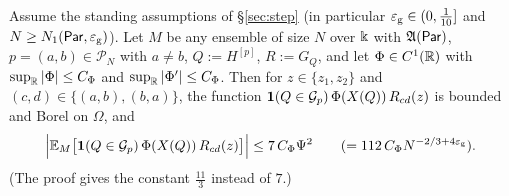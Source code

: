 \begin{lemma}\label{lem:decor}
Assume the standing assumptions of \S\ref{sec:step} \textup{(}in particular $\varepsilon_{\mathrm g}\in(0,\frac1{10}]$ and $N\ge N_1(\mathsf{Par},\varepsilon_{\mathrm g})$\textup{)}.
Let $M$ be any ensemble of size $N$ over $\Bbbk$ with $\mathfrak{A}(\mathsf{Par})$, $p=(a,b)\in\mathcal P_N$ with $a\ne b$, $Q:=H^{[p]}$, $R:=G_Q$, and let
$\Phi\in C^1(\mathbb{R})$ with $\sup_{\mathbb{R}}|\Phi|\le C_\Phi$ and $\sup_{\mathbb{R}}|\Phi'|\le C_\Phi$. Then for $z\in\{z_1,z_2\}$ and $(c,d)\in\{(a,b),(b,a)\}$, the function
$\mathbf 1(Q\in\mathcal{G}_p)\,\Phi(X(Q))\,R_{cd}(z)$ is bounded and Borel on $\Omega$, and
\[
\Big|\mathbb{E}_M\big[\mathbf 1(Q\in\mathcal{G}_p)\,\Phi(X(Q))\,R_{cd}(z)\big]\Big|\le7\,C_\Phi\Psi^2\qquad(=112\,C_\Phi N^{-2/3+4\varepsilon_{\mathrm g}}).
\]
\textup{(The proof gives the constant $\frac{11}3$ instead of $7$.)}
\end{lemma}
